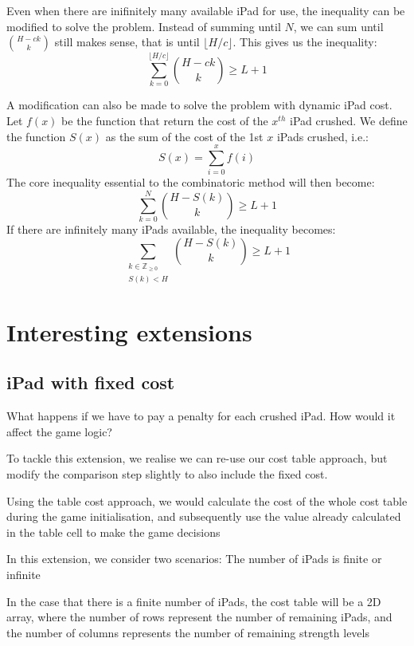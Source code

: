 \documentclass[12pt,a4paper,oneside]{report}
\begin{document}
Even when there are inifinitely many available iPad for use, the inequality can be modified to solve the problem. Instead of summing until $N$, we can sum until ${H-ck \choose k}$ still makes sense, that is until $\lfloor H/c \rfloor$. This gives us the inequality: \[\sum_{k=0}^{\lfloor H/c \rfloor} {H-ck \choose k} \geq L+1\]

A modification can also be made to solve the problem with dynamic iPad cost. Let $f(x)$ be the function that return the cost of the $x^{th}$ iPad crushed. We define the function $S(x)$ as the sum of the cost of the 1st $x$ iPads crushed, i.e.: \[S(x) = \sum_{i=0}^x f(i)\] The core inequality essential to the combinatoric method will then become: \[\sum_{k=0}^N {H-S(k) \choose k} \geq L+1\] If there are infinitely many iPads available, the inequality becomes: \[\sum_{\substack{k \in \mathbb{Z}_{\geq 0}\\ S(k) < H}} {H-S(k) \choose k} \geq L+1\]


\chapter{Interesting extensions}
\section{iPad with fixed cost}

What happens if we have to pay a penalty for each crushed iPad. How would it affect the game logic?

To tackle this extension, we realise we can re-use our cost table approach, but modify the comparison step slightly to also include the fixed cost. 

Using the table cost approach, we would calculate the cost of the whole cost table during the game initialisation, and subsequently use the value already calculated in the table cell to make the game decisions

In this extension, we consider two scenarios: The number of iPads is finite or infinite

In the case that there is a finite number of iPads, the cost table will be a 2D array, where the number of rows represent the number of remaining iPads, and the number of columns represents the number of remaining strength levels
\end{document}
